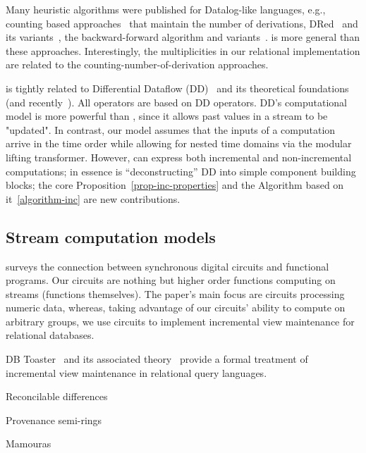Many heuristic algorithms were published for Datalog-like languages, e.g., 
counting based approaches~\cite{Dewan-iis92,motik-aaai15} that maintain the number of derivations,
DRed~\cite{gupta-sigmod93} and its variants~\cite{Ceri-VLDB91,Wolfson-sigmod91,%
Staudt-vldb96,Kotowski-rr11,Lu-sigmod95,Apt-sigmod87}, the backward-forward algorithm and variants~\cite{motik-aaai15,
Harrison-wdd92,motik-ai19}.  \dbsp is more general than these approaches.  
Interestingly, the \zrs multiplicities in our relational implementation 
are related to the counting-number-of-derivation approaches.

\dbsp is tightly related to Differential Dataflow (DD)~\cite{mcsherry-cidr13, murray-sosp13}
and its theoretical foundations~\cite{abadi-fossacs15} (and recently~\cite{mchserry-vldb20,chothia-vldb16}).
All \dbsp operators are based on DD operators.  DD's computational model is more powerful than
\dbsp, since it allows past values in a stream to be "updated".
In contrast, our model assumes that the inputs of a computation arrive in the time order while allowing 
for nested time domains via the modular lifting transformer.  However, \dbsp can express both
incremental and non-incremental computations; in essence \dbsp is ``deconstructing'' DD into 
simple component building blocks; the core Proposition~\ref{prop-inc-properties} and
the Algorithm based on it~\ref{algorithm-inc} are new contributions.

\subsection{Stream computation models}

\cite{gammie-acs13} surveys the connection between synchronous digital circuits and functional programs.
Our circuits are nothing but higher order functions computing on streams (functions themselves).
The paper's main focus are circuits processing numeric data, whereas, taking advantage of our circuits'
ability to compute on arbitrary groups, we use circuits to implement incremental view maintenance for
relational databases.

DB Toaster~\cite{ahmad-vldb09} and its associated theory~\cite{koch-pods10, koch-pods16}
provide a formal treatment of incremental view maintenance in relational query languages.

Reconcilable differences~\cite{green-tcs11}

Provenance semi-rings~\cite{green-pods07}

Mamouras~\cite{mamouras-esop20}  

